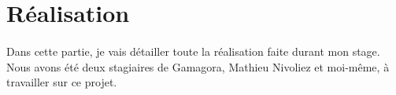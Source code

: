 \section{Réalisation}

\paragraph{}Dans cette partie, je vais détailler toute la réalisation faite durant mon stage. Nous avons été deux stagiaires de Gamagora, Mathieu Nivoliez et moi-même, à travailler
sur ce projet.







\newpage





\newpage